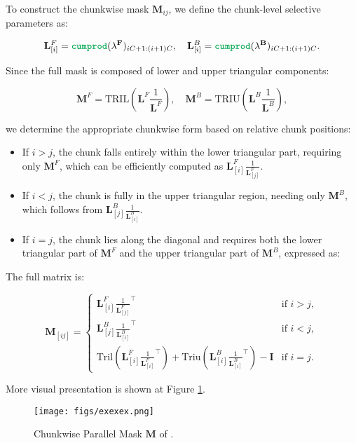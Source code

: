 To construct the chunkwise mask \(\mathbf{M}_{ij}\), we define the chunk-level selective parameters as:  

\[
\mathbf{L}^F_{[i]} = \cumprod(\mathbf{\lambda^F})_{iC+1:(i+1)C}, \quad \mathbf{L}^B_{[i]} = \cumprod(\mathbf{\lambda^B})_{iC+1:(i+1)C}.
\]

Since the full mask is composed of lower and upper triangular components:

\[
\mathbf{M}^F = \text{TRIL}(\mathbf{L}^F \frac{1}{\mathbf{L}^F}), \quad \mathbf{M}^B = \text{TRIU}(\mathbf{L}^B \frac{1}{\mathbf{L}^B}),
\]

we determine the appropriate chunkwise form based on relative chunk positions:  

\begin{itemize}
   \item If \(i > j\), the chunk falls entirely within the lower triangular part, requiring only \(\mathbf{M}^F\), which can be efficiently computed as \(\mathbf{L}^F_{[i]} \frac{1}{\mathbf{L}^F_{[j]}}\).  
\item If \(i < j\), the chunk is fully in the upper triangular region, needing only \(\mathbf{M}^B\), which follows from \(\mathbf{L}^B_{[j]} \frac{1}{\mathbf{L}^B_{[i]}}\).  
\item If \(i = j\), the chunk lies along the diagonal and requires both the lower triangular part of \(\mathbf{M}^F\) and the upper triangular part of \(\mathbf{M}^B\), expressed as:

\end{itemize}
    
The full matrix is: 

\[
\mathbf{M}_{[ij]} = 
\begin{cases} 
\mathbf{L}^F_{[i]} \frac{1}{\mathbf{L}^F_{[j]}}^\top & \text{if } i>j,  \\
\mathbf{L}^B_{[j]} \frac{1}{\mathbf{L}^B_{[i]}}^\top & \text{if } i<j,  \\
\text{Tril}\left(\mathbf{L}^F_{[i]} \frac{1}{\mathbf{L}^F_{[i]}}^\top\right) + \text{Triu}\left(\mathbf{L}^B_{[i]} \frac{1}{\mathbf{L}^B_{[i]}}^\top\right) - \mathbf{I} & \text{if } i = j. 
\end{cases} 
\]

More visual presentation is shown at Figure \cref{maskchunk}.

\begin{figure}[tb]
    \centering
    \texttt{[image: figs/exexex.png]}
  \caption{Chunkwise Parallel Mask $\mathbf{M}$ of \lion.}
    \label{maskchunk}
\end{figure}

